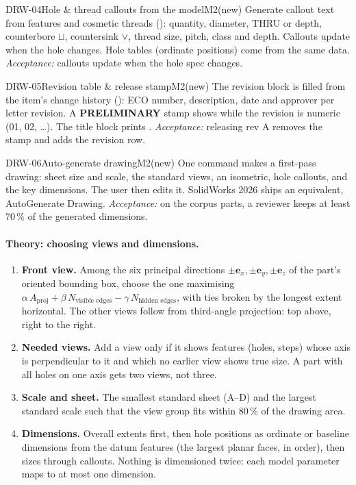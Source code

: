 \begin{epic}{DRW-04}{Hole \& thread callouts from the model}{M2}{\stTodo}{(new)}
Generate callout text from  features and cosmetic threads (): quantity, diameter,
THRU or depth, counterbore $\sqcup$, countersink $\vee$, thread size, pitch, class and depth. Callouts update
when the hole changes. Hole tables (ordinate positions) come from the same data.
\emph{Acceptance:} callouts update when the hole spec changes.
\end{epic}

\begin{epic}{DRW-05}{Revision table \& release stamp}{M2}{\stTodo}{(new)}
The revision block is filled from the item's change history (): ECO number, description, date and
approver per letter revision. A \textbf{PRELIMINARY} stamp shows while the revision is numeric (01, 02, \ldots).
The title block prints .
\emph{Acceptance:} releasing rev A removes the stamp and adds the revision row.
\end{epic}

\begin{epic}{DRW-06}{Auto-generate drawing}{M2}{\stTodo}{(new)}
One command makes a first-pass drawing: sheet size and scale, the standard views, an isometric, hole callouts,
and the key dimensions. The user then edits it. SolidWorks 2026 ships an equivalent, AutoGenerate Drawing.
\emph{Acceptance:} on the corpus parts, a reviewer keeps at least 70\,\% of the generated dimensions.
\end{epic}

\paragraph{Theory: choosing views and dimensions.}
\begin{enumerate}
  \item \textbf{Front view.} Among the six principal directions $\pm\mathbf e_x,\pm\mathbf e_y,\pm\mathbf e_z$
        of the part's oriented bounding box, choose the one maximising
        $\alpha\,A_{\text{proj}}+\beta\,N_{\text{visible edges}}-\gamma\,N_{\text{hidden edges}}$, with
        ties broken by the longest extent horizontal. The other views follow from third-angle
        projection: top above, right to the right.
  \item \textbf{Needed views.} Add a view only if it shows features (holes, steps) whose axis is
        perpendicular to it and which no earlier view shows true size. A part with all holes on one axis gets
        two views, not three.
  \item \textbf{Scale and sheet.} The smallest standard sheet (A--D) and the largest standard scale such that
        the view group fits within 80\,\% of the drawing area.
  \item \textbf{Dimensions.} Overall extents first, then hole positions as ordinate or baseline dimensions
        from the datum features (the largest planar faces, in order), then sizes through callouts. Nothing is
        dimensioned twice: each model parameter maps to at most one dimension.
\end{enumerate}

